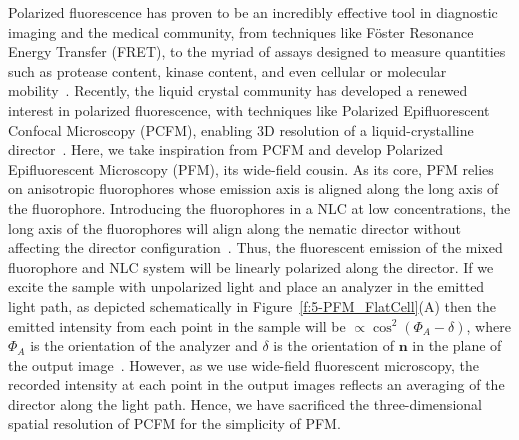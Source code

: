 Polarized fluorescence has proven to be an incredibly effective tool in diagnostic imaging and the medical community, from techniques like F\"oster Resonance Energy Transfer (FRET), to the myriad of assays designed to measure quantities such as protease content, kinase content, and even cellular or molecular mobility~\cite{RN282,RN284}.
Recently, the liquid crystal community has developed a renewed interest in polarized fluorescence, with techniques like Polarized Epifluorescent Confocal Microscopy (PCFM), enabling 3D resolution of a liquid-crystalline director~\cite{RN148,RN174}.
Here, we take inspiration from PCFM and develop Polarized Epifluorescent Microscopy (PFM), its wide-field cousin.
As its core, PFM relies on anisotropic fluorophores whose emission axis is aligned along the long axis of the fluorophore.
Introducing the fluorophores in a NLC at low concentrations, the long axis of the fluorophores will align along the nematic director without affecting the director configuration~\cite{RN148,RN174}.
Thus, the fluorescent emission of the mixed fluorophore and NLC system will be linearly polarized along the director.
If we excite the sample with unpolarized light and place an analyzer in the emitted light path, as depicted schematically in Figure~\ref{f:5-PFM_FlatCell}(A) then the emitted intensity from each point in the sample will be $\propto \cos^2{(\Phi_A-\delta)}$, where $\Phi_A$ is the orientation of the analyzer and $\delta$ is the orientation of $\mathbf{n}$ in the plane of the output image~\cite{RN174}.
However, as we use wide-field fluorescent microscopy, the recorded intensity at each point in the output images reflects an averaging of the director along the light path.
Hence, we have sacrificed the three-dimensional spatial resolution of PCFM for the simplicity of PFM.
